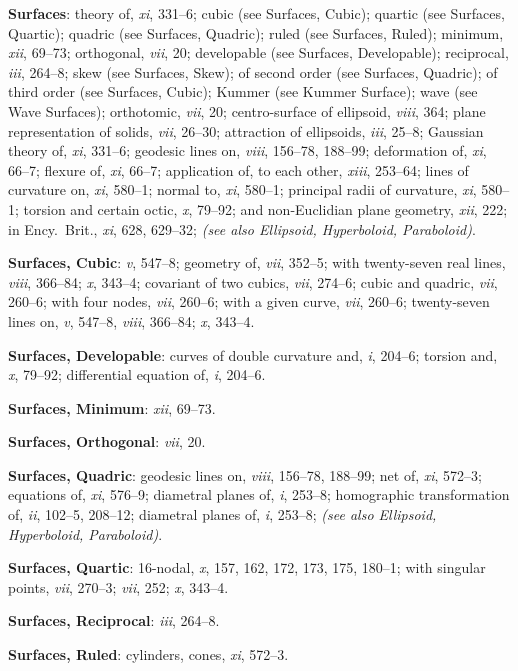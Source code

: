 \documentclass[11pt,a4paper]{article}
\newcommand{\IndexEntry}[1]{\textbf{#1}}
\newcommand{\SeeAlso}[1]{\textit{(see also #1)}}
\newcommand{\V}[1]{\textit{#1}} %
\begin{document}
\IndexEntry{Surfaces}: theory of, \V{xi}, 331--6; cubic (see Surfaces, Cubic); quartic (see Surfaces, Quartic); quadric (see Surfaces, Quadric); ruled (see Surfaces, Ruled); minimum, \V{xii}, 69--73; orthogonal, \V{vii}, 20; developable (see Surfaces, Developable); reciprocal, \V{iii}, 264--8; skew (see Surfaces, Skew); of second order (see Surfaces, Quadric); of third order (see Surfaces, Cubic); Kummer (see Kummer Surface); wave (see Wave Surfaces); orthotomic, \V{vii}, 20; centro-surface of ellipsoid, \V{viii}, 364; plane representation of solids, \V{vii}, 26--30; attraction of ellipsoids, \V{iii}, 25--8; Gaussian theory of, \V{xi}, 331--6; geodesic lines on, \V{viii}, 156--78, 188--99; deformation of, \V{xi}, 66--7; flexure of, \V{xi}, 66--7; application of, to each other, \V{xiii}, 253--64; lines of curvature on, \V{xi}, 580--1; normal to, \V{xi}, 580--1; principal radii of curvature, \V{xi}, 580--1; torsion and certain octic, \V{x}, 79--92; and non-Euclidian plane geometry, \V{xii}, 222; in Ency.\ Brit., \V{xi}, 628, 629--32; \SeeAlso{Ellipsoid, Hyperboloid, Paraboloid}.

\IndexEntry{Surfaces, Cubic}: \V{v}, 547--8; geometry of, \V{vii}, 352--5; with twenty-seven real lines, \V{viii}, 366--84; \V{x}, 343--4; covariant of two cubics, \V{vii}, 274--6; cubic and quadric, \V{vii}, 260--6; with four nodes, \V{vii}, 260--6; with a given curve, \V{vii}, 260--6; twenty-seven lines on, \V{v}, 547--8, \V{viii}, 366--84; \V{x}, 343--4.

\IndexEntry{Surfaces, Developable}: curves of double curvature and, \V{i}, 204--6; torsion and, \V{x}, 79--92; differential equation of, \V{i}, 204--6.

\IndexEntry{Surfaces, Minimum}: \V{xii}, 69--73.

\IndexEntry{Surfaces, Orthogonal}: \V{vii}, 20.

\IndexEntry{Surfaces, Quadric}: geodesic lines on, \V{viii}, 156--78, 188--99; net of, \V{xi}, 572--3; equations of, \V{xi}, 576--9; diametral planes of, \V{i}, 253--8; homographic transformation of, \V{ii}, 102--5, 208--12; diametral planes of, \V{i}, 253--8; \SeeAlso{Ellipsoid, Hyperboloid, Paraboloid}.

\IndexEntry{Surfaces, Quartic}: 16-nodal, \V{x}, 157, 162, 172, 173, 175, 180--1; with singular points, \V{vii}, 270--3; \V{vii}, 252; \V{x}, 343--4.

\IndexEntry{Surfaces, Reciprocal}: \V{iii}, 264--8.

\IndexEntry{Surfaces, Ruled}: cylinders, cones, \V{xi}, 572--3.
\end{document}
